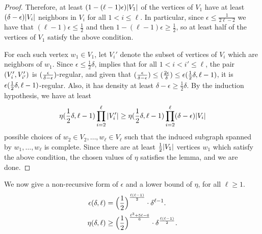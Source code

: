 \begin{lemma}
\begin{proof}
                Therefore, at least $(1 - (\ell -1) \epsilon) | V_1 |$ of the vertices of $V_1$ have at least
                $(\delta - \epsilon) | V_i |$ neighbors in $V_i$ for all $1 < i \leq \ell$.
                In particular, since $\epsilon \leq \frac{1}{2\ell - 2}$ we have that $(\ell - 1) \epsilon \leq \frac{1}{2}$
                and then $1 - (\ell - 1) \epsilon \geq \frac{1}{2}$, so at least half of the vertices of $V_1$ satisfy the
                above condition.

                For each such vertex $w_1 \in V_1$, let $V_i'$ denote the subset of vertices of $V_i$ which are neighbors
                of $w_1$.
                Since $\epsilon \leq \frac{1}{2}\delta$,  implies that for all
                $1 < i < i' \leq \ell$, the pair $( V_i', V_{i'}' )$ is $( \frac{\epsilon}{\delta-\epsilon} )$-regular,
                and given that $( \frac{\epsilon}{\delta-\epsilon} ) \leq ( \frac{2\epsilon}{\delta} ) \leq \epsilon( \frac{1}{2}\delta, \ell-1 )$,
                it is $\epsilon( \frac{1}{2}\delta, \ell-1 )$-regular.
                Also, it has density at least $\delta - \epsilon \geq \frac{1}{2} \delta$.
                By the induction hypothesis, we have at least
                \[
                    \eta ( \frac{1}{2}\delta, \ell-1 ) \prod_{i=2}^\ell | V_i' |
                        \geq \eta ( \frac{1}{2}\delta, \ell-1 ) \prod_{i=2}^\ell ( \delta - \epsilon ) | V_i |
                \]
                possible choices of $w_2 \in V_2, \dots, w_\ell \in V_\ell$ such that the induced subgraph spanned by
                $w_1, \dots, w_\ell$ is complete.
                Since there are at least $\frac{1}{2} | V_1 |$ vertices $w_1$ which satisfy the above condition,
                the chosen values of $\eta$ satisfies the lemma, and we are done.
            \end{proof}
        \end{lemma}

        \begin{remark}
            We now give a non-recursive form of $\epsilon$ and a lower bound of $\eta$, for all $\ell \geq 1$.
            \begin{align*}
                \epsilon(\delta, \ell) & = \Bigl( \frac{1}{2} \Bigr)^{\frac{\ell(\ell-1)}{2}} \cdot \delta^{\ell-1}. \\
                \eta(\delta, \ell) & \geq \Bigl( \frac{1}{2} \Bigr)^{\frac{\ell^3+5\ell-6}{6}} \cdot \delta^{\frac{\ell(\ell-1)}{2}}.
            \end{align*}
        \end{remark}

